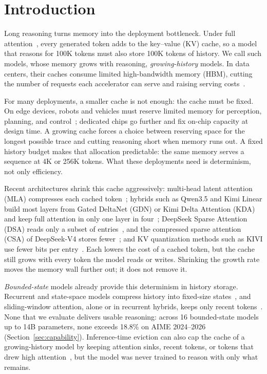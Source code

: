 \section{Introduction}
\label{sec:thesis}

Long reasoning turns memory into the deployment bottleneck. Under full attention~\cite{transformer}, every generated token adds to the key--value (KV) cache, so a model that reasons for 100K tokens must also store 100K tokens of history. We call such models, whose memory grows with reasoning, \emph{growing-history} models. In data centers, their caches consume limited high-bandwidth memory (HBM), cutting the number of requests each accelerator can serve and raising serving costs~\cite{pagedattention}.

For many deployments, a smaller cache is not enough: the cache must be fixed. On edge devices, robots and vehicles must reserve limited memory for perception, planning, and control~\cite{edge_llm}; dedicated chips go further and fix on-chip capacity at design time. A growing cache forces a choice between reserving space for the longest possible trace and cutting reasoning short when memory runs out. A fixed history budget makes that allocation predictable: the same memory serves a sequence at 4K or 256K tokens. What these deployments need is determinism, not only efficiency.

Recent architectures shrink this cache aggressively: multi-head latent attention (MLA) compresses each cached token~\cite{deepseekv2}; hybrids such as Qwen3.5 and Kimi Linear build most layers from Gated DeltaNet (GDN) or Kimi Delta Attention (KDA) and keep full attention in only one layer in four~\cite{qwen35,kimilinear}; DeepSeek Sparse Attention (DSA) reads only a subset of entries~\cite{deepseekv32}, and the compressed sparse attention (CSA) of DeepSeek-V4 stores fewer~\cite{deepseekv4}; and KV quantization methods such as KIVI use fewer bits per entry~\cite{kivi}. Each lowers the cost of a cached token, but the cache still grows with every token the model reads or writes. Shrinking the growth rate moves the memory wall further out; it does not remove it.

\emph{Bounded-state} models already provide this determinism in history storage. Recurrent and state-space models compress history into fixed-size states~\cite{mamba,rwkv7,xlstm}, and sliding-window attention, alone or in recurrent hybrids, keeps only recent tokens~\cite{longformer,recurrentgemma,samba}. None that we evaluate delivers usable reasoning: across 16 bounded-state models up to 14B parameters, none exceeds 18.8\% on AIME 2024--2026 (Section~\ref{sec:capability}). Inference-time eviction can also cap the cache of a growing-history model by keeping attention sinks, recent tokens, or tokens that drew high attention~\cite{streamingllm,h2o,snapkv}, but the model was never trained to reason with only what remains.

